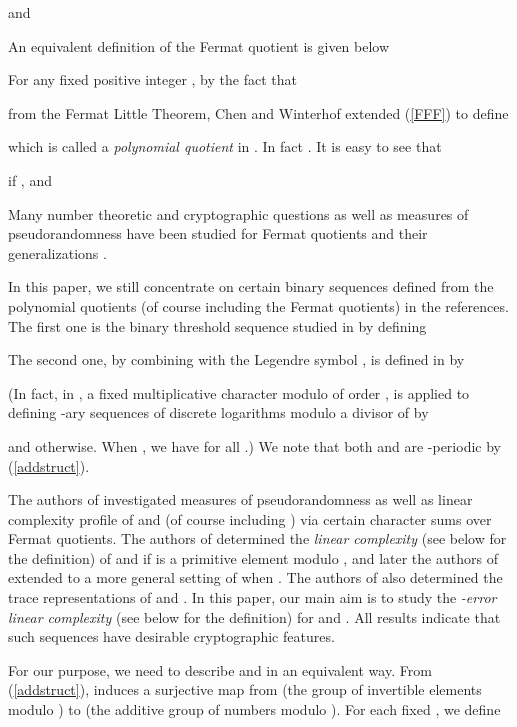 \documentclass [11pt,a4paper]{article}
\begin{document}
and

An equivalent definition of the Fermat quotient is given below

For any fixed positive integer , by the fact that

from the Fermat Little Theorem, Chen and Winterhof extended (\ref{FFF})
to define

which is called a \emph{polynomial quotient} in \cite{CW2}. In
fact . It is easy to see that

if , and


Many number theoretic and cryptographic questions as well as
measures of pseudorandomness have been studied for Fermat quotients
and their generalizations
\cite{ADS,AW,BFKS,C,CD,CG,COW,CW2,CW,CW3,DCH,DKC,EM,GW,OS,Sha,Shk,S,S2010,S2011,S2011b,SW}.






In this paper, we still concentrate on certain binary sequences defined from the polynomial quotients (of course including the Fermat quotients) in the references.
The first one is the binary threshold sequence  studied in \cite{CD,CG,CHD,COW,CW4,DKC} by defining

The second one, by combining  with the Legendre symbol
, is defined in \cite{CHD,CW4,DKC,GW} by

(In fact, in \cite{DKC,GW} , a fixed multiplicative
character modulo  of order , is applied to defining -ary sequences  of
discrete logarithms modulo a divisor  of  by

and  otherwise. When , we have  for all .) We note that both  and  are -periodic by (\ref{addstruct}).


The authors of \cite{COW,GW} investigated measures of pseudorandomness as well as linear complexity profile of
 and  (of course including ) via certain character sums over Fermat quotients.
The authors of \cite{CHD,DKC}  determined the \emph{linear complexity} (see
 below for the definition) of  and  if  is a primitive element modulo , and later the authors of \cite{CD,CG,CW4}  extended to a more general setting of  when . The authors of \cite{CW4}  also determined the  trace representations of  and . In this paper, our main aim is to study the \emph{-error linear complexity} (see  below for the definition) for  and .
All results indicate that such sequences have desirable cryptographic features.



For our purpose, we need to describe   and  in an equivalent way. From (\ref{addstruct}),
 induces a surjective map from  (the group of invertible
elements modulo ) to  (the additive group of numbers modulo ). For each fixed , we define
\end{document}
